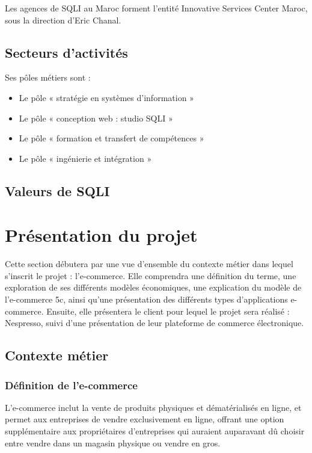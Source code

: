 Les agences de SQLI au Maroc forment l'entité Innovative Services Center Maroc, sous la direction d'Eric Chanal. 

\subsection{Secteurs d'activités}

Ses pôles métiers sont : 
\begin{itemize}
    \item Le pôle « stratégie en systèmes d’information »
    \item Le pôle « conception web : studio SQLI »
    \item Le pôle « formation et transfert de compétences »
    \item Le pôle « ingénierie et intégration »
\end{itemize}

\subsection{Valeurs de SQLI}


\section{Présentation du projet}


Cette section débutera par une vue d'ensemble du contexte métier dans lequel s'inscrit le projet : l'e-commerce. Elle comprendra une définition du terme, une exploration de ses différents modèles économiques, une explication du modèle de l'e-commerce 5c, ainsi qu'une présentation des différents types d'applications e-commerce. Ensuite, elle présentera le client pour lequel le projet sera réalisé : Nespresso, suivi d'une présentation de leur plateforme de commerce électronique. 

\subsection{Contexte métier}
\subsubsection{Définition de l'e-commerce}

L'e-commerce inclut la vente de produits physiques et dématérialisés en ligne, et permet aux entreprises de vendre exclusivement en ligne, offrant une option supplémentaire aux propriétaires d'entreprises qui auraient auparavant dû choisir entre vendre dans un magasin physique ou vendre en gros.

